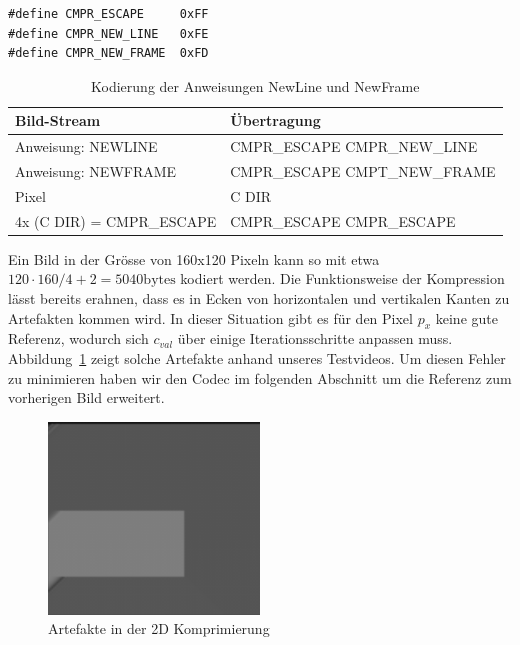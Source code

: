 \begin{lstlisting}[caption=Definierte Bit-Muster in der 2D Kompression,%
                   label=lst:cmpr-bit2d]
#define CMPR_ESCAPE     0xFF
#define CMPR_NEW_LINE   0xFE
#define CMPR_NEW_FRAME  0xFD
\end{lstlisting}

\begin{table}[htbp]
\centering
\begin{tabular}{|l|l|}
\hline
Bild-Stream & \"Ubertragung \\ \hline
Anweisung: NEWLINE & CMPR\_ESCAPE CMPR\_NEW\_LINE \\
Anweisung: NEWFRAME & CMPR\_ESCAPE CMPT\_NEW\_FRAME \\
Pixel & C DIR \\
4x (C DIR) = CMPR\_ESCAPE & CMPR\_ESCAPE CMPR\_ESCAPE \\ 
\hline
\end{tabular}
\caption{Kodierung der Anweisungen NewLine und NewFrame}
\label{tbl:codec-symbols}
\end{table}

Ein Bild in der Gr\"osse von 160x120 Pixeln kann so mit etwa $120 \cdot 160/4 + 2 = 5040
\text{bytes}$ kodiert werden.
Die Funktionsweise der Kompression l\"asst bereits erahnen, dass es in Ecken von
horizontalen und vertikalen Kanten zu Artefakten kommen wird. In dieser
Situation gibt es f\"ur den Pixel $p_x$ keine gute Referenz, wodurch sich
$c_{val}$ \"uber einige Iterationsschritte anpassen muss.
Abbildung~\ref{fig:codec2d-artifact} zeigt solche Artefakte anhand unseres
Testvideos. Um diesen Fehler zu minimieren haben wir den Codec im folgenden
Abschnitt um die Referenz zum vorherigen Bild erweitert.
\begin{figure}[tbp]
\begin{center}
\includegraphics[width=0.5\textwidth]{img/codec2d-artifact}
\end{center}
\caption{Artefakte in der 2D Komprimierung}
\label{fig:codec2d-artifact}
\end{figure}
%
%
